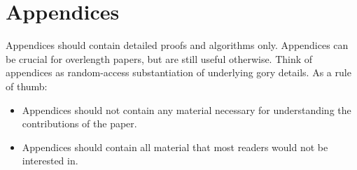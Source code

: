 \section{Appendices}
Appendices should contain detailed proofs and algorithms only. Appendices can be crucial for overlength papers, but are still useful otherwise. Think of appendices as random-access substantiation of underlying gory details. As a rule of thumb:

\begin{itemize}
    \item Appendices should not contain any material necessary for understanding the contributions of the paper.
    \item Appendices should contain all material that most readers would not be interested in.
\end{itemize}